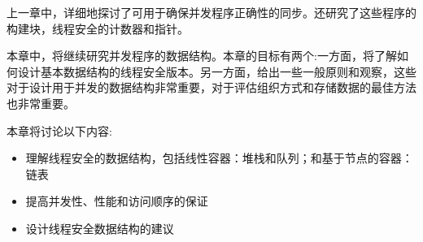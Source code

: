 上一章中，详细地探讨了可用于确保并发程序正确性的同步。还研究了这些程序的构建块，线程安全的计数器和指针。

本章中，将继续研究并发程序的数据结构。本章的目标有两个:一方面，将了解如何设计基本数据结构的线程安全版本。另一方面，给出一些一般原则和观察，这些对于设计用于并发的数据结构非常重要，对于评估组织方式和存储数据的最佳方法也非常重要。

本章将讨论以下内容:

\begin{itemize}
\item
理解线程安全的数据结构，包括线性容器：堆栈和队列；和基于节点的容器：链表

\item
提高并发性、性能和访问顺序的保证

\item
设计线程安全数据结构的建议

\end{itemize}
















